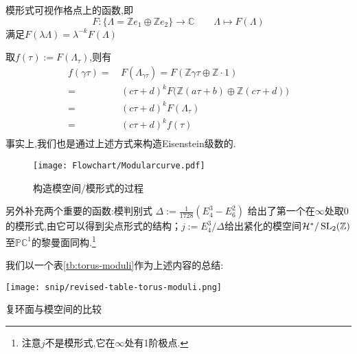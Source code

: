 \begin{remark}
	模形式可视作格点上的函数,即
	$$F: \{\Lambda= \mathbb{Z}e_1 \oplus \mathbb{Z}e_2 \} \longrightarrow \mathbb{C} \qquad \Lambda \longmapsto F(\Lambda)$$
	满足$F(\lambda \Lambda)= \lambda^{-k} F(\Lambda)$
	
	取$f(\tau):=F(\Lambda_{\tau})$,则有
	\begin{equation*}
	\begin{aligned}
	f(\gamma \tau) =\, & F(\Lambda_{\gamma\tau})=F(\mathbb{Z}\gamma\tau \oplus \mathbb{Z} \!\cdot\!\! 1)\\
	=\,& (c\tau + d)^k F\big(\mathbb{Z}(a\tau+b) \oplus \mathbb{Z}(c\tau +d)\big)		\\
	=\,& (c\tau + d)^k F(\Lambda_{\tau})		\\
	=\,& (c\tau + d)^k f(\tau)		\\
	\end{aligned}
	\end{equation*}
	事实上,我们也是通过上述方式来构造Eisenstein级数的.
\end{remark}
\begin{figure}[ht]
		\centering
		\texttt{[image: Flowchart/Modularcurve.pdf]}
	\caption{构造模空间/模形式的过程}
	\label{pic:Modularcurve}
\end{figure}
另外补充两个重要的函数:模判别式
$\Delta:=\frac{1}{1728}(E_4^3-E_6^2)$
给出了第一个在$\infty$处取0的模形式,由它可以得到尖点形式的结构；$j:=E_4^3/\Delta$给出紧化的模空间$\mathcal{H}^*/\operatorname{SL}_2(\mathbb{Z})$至$\mathbb{PC}^1$的黎曼面同构.\footnote{注意$j$不是模形式,它在$\infty$处有1阶极点.}

我们以一个表\ref{tb:torus-moduli}作为上述内容的总结:
\begin{table}[ht]
	\centering
	\texttt{[image: snip/revised-table-torus-moduli.png]}
	\caption{复环面与模空间的比较}
	\label{tb:torus-moduli}
\end{table}

